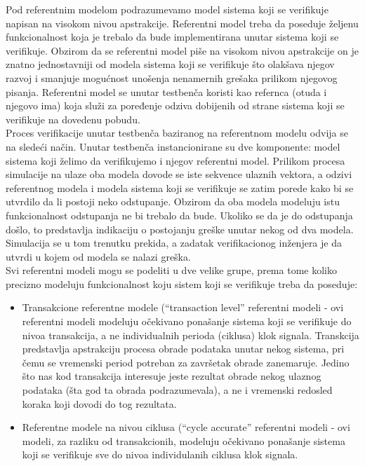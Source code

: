 Pod referentnim modelom podrazumevamo model sistema koji se verifikuje napisan
na visokom nivou apstrakcije. Referentni model treba da poseduje željenu
funkcionalnost koja je trebalo da bude implementirana unutar sistema koji se
verifikuje. Obzirom da se referentni model piše na visokom nivou apstrakcije on
je znatno jednostavniji od modela sistema koji se verifikuje što olakšava njegov
razvoj i smanjuje mogućnost unošenja nenamernih grešaka prilikom njegovog
pisanja. Referentni model se unutar testbenča koristi kao refernca (otuda i
njegovo ima) koja služi za poređenje odziva dobijenih od strane sistema koji se
verifikuje na dovedenu pobudu.\\


Proces verifikacije unutar testbenča baziranog na referentnom modelu odvija se
na sledeći način. Unutar testbenča instancionirane su dve komponente: model
sistema koji želimo da verifikujemo i njegov referentni model. Prilikom procesa
simulacije na ulaze oba modela dovode se iste sekvence ulaznih vektora, a odzivi
referentnog modela i modela sistema koji se verifikuje se zatim porede kako bi
se utvrdilo da li postoji neko odstupanje. Obzirom da oba modela modeluju istu
funkcionalnost odstupanja ne bi trebalo da bude. Ukoliko se da je do odstupanja
došlo, to predstavlja indikaciju o postojanju greške unutar nekog od dva modela.
Simulacija se u tom trenutku prekida, a zadatak verifikacionog inženjera je da
utvrdi u kojem od modela se nalazi greška.\\

Svi referentni modeli mogu se podeliti u dve velike grupe, prema tome koliko
precizno modeluju funkcionalnost koju sistem koji se verifikuje treba da
poseduje:

\begin{itemize}
\item Transakcione referentne modele (``transaction level'' referentni modeli -
  ovi referentni modeli modeluju očekivano ponašanje sistema koji se verifikuje
  do nivoa transakcija, a ne individualnih perioda (ciklusa) klok signala.
  Transkcija predstavlja apstrakciju procesa obrade podataka unutar nekog
  sistema, pri čemu se vremenski period potreban za završetak obrade zanemaruje.
  Jedino što nas kod transakcija interesuje jeste rezultat obrade nekog ulaznog
  podataka (šta god ta obrada podrazumevala), a ne i vremenski redosled koraka
  koji dovodi do tog rezultata.
\item Referentne modele na nivou ciklusa (``cycle accurate'' referentni modeli
  - ovi modeli, za razliku od transakcionih, modeluju očekivano ponašanje
  sistema koji se verifikuje sve do nivoa individulanih ciklusa klok signala.
\end{itemize}

